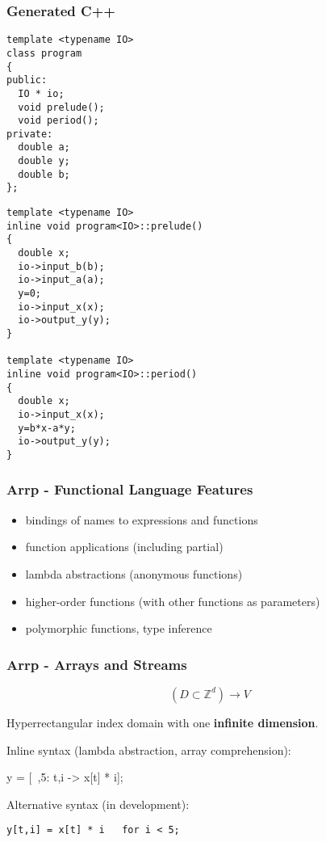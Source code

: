 \documentclass{beamer}
\begin{document}
\begin{frame}[fragile]
\frametitle{Generated C++}

\footnotesize

\begin{minipage}{0.49\linewidth}
\begin{BVerbatim}
template <typename IO>
class program
{
public:
  IO * io;
  void prelude();
  void period();
private:
  double a;
  double y;
  double b;
};
\end{BVerbatim}
\end{minipage}\hfill
\begin{minipage}{0.49\linewidth}
\begin{BVerbatim}
template <typename IO>
inline void program<IO>::prelude()
{
  double x;
  io->input_b(b);
  io->input_a(a);
  y=0;
  io->input_x(x);
  io->output_y(y);
}

template <typename IO>
inline void program<IO>::period()
{
  double x;
  io->input_x(x);
  y=b*x-a*y;
  io->output_y(y);
}
\end{BVerbatim}
\end{minipage}

\end{frame}


\begin{frame}
\frametitle{Arrp - Functional Language Features}

\begin{itemize}
\item bindings of names to expressions and functions
\item function applications (including partial)
\item lambda abstractions (anonymous functions)
\item higher-order functions (with other functions as parameters)
\item polymorphic functions, type inference
\end{itemize}

\end{frame}

\begin{frame}[fragile]
\frametitle{Arrp - Arrays and Streams}

\[(D \subset \mathbb{Z}^d) \to V\]

Hyperrectangular index domain with one \textbf{infinite dimension}.
\vspace{\baselineskip}

Inline syntax (lambda abstraction, array comprehension):

\begin{semiverbatim}
y = [~,5: t,i -> x[t] * i];
\end{semiverbatim}

Alternative syntax (in development):

\begin{verbatim}
y[t,i] = x[t] * i   for i < 5;
\end{verbatim}

\end{frame}
\end{document}
